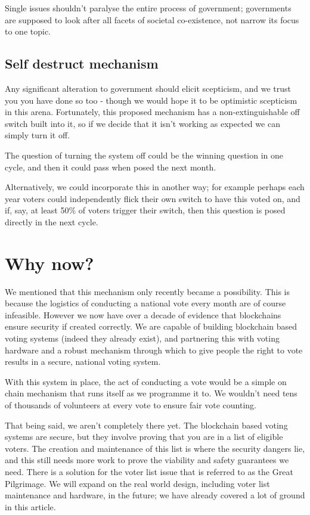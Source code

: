\documentclass[twoside]{article}
\theoremstyle{definition}
\begin{document}
Single issues shouldn’t paralyse the entire process of government; governments are supposed to look after all facets of societal co-existence, not narrow its focus to one topic.

\subsection{Self destruct mechanism}

Any significant alteration to government should elicit scepticism, and we trust you you have done so too - though we would hope it to be optimistic scepticism in this arena. Fortunately, this proposed mechanism has a non-extinguishable off switch built into it, so if we decide that it isn’t working as expected we can simply turn it off.

The question of turning the system off could be the winning question in one cycle, and then it could pass when posed the next month.

Alternatively, we could incorporate this in another way; for example perhaps each year voters could independently flick their own switch to have this voted on, and if, say, at least 50\% of voters trigger their switch, then this question is posed directly in the next cycle.

\section{Why now?}

We mentioned that this mechanism only recently became a possibility. This is because the logistics of conducting a national vote every month are of course infeasible. However we now have over a decade of evidence that blockchains ensure security if created correctly. We are capable of building blockchain based voting systems (indeed they already exist), and partnering this with voting hardware and a robust mechanism through which to give people the right to vote results in a secure, national voting system.

With this system in place, the act of conducting a vote would be a simple on chain mechanism that runs itself as we programme it to. We wouldn’t need tens of thousands of volunteers at every vote to ensure fair vote counting.

That being said, we aren’t completely there yet. The blockchain based voting systems are secure, but they involve proving that you are in a list of eligible voters. The creation and maintenance of this list is where the security dangers lie, and this still needs more work to prove the viability and safety guarantees we need. There is a solution for the voter list issue that is referred to as the Great Pilgrimage. We will expand on the real world design, including voter list maintenance and hardware, in the future; we have already covered a lot of ground in this article.
\end{document}
